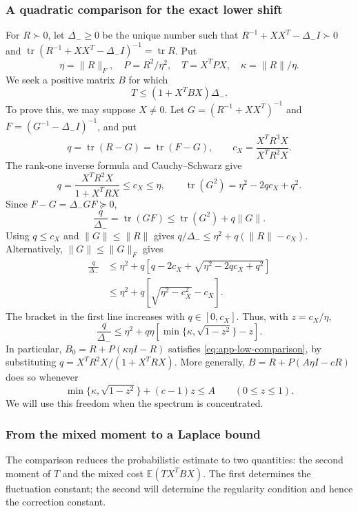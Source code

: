 \documentclass[11pt,a4paper]{article}
\numberwithin{equation}{section}
\begin{document}
\subsubsection{A quadratic comparison for the exact lower shift}
For $R\succ0$, let $\Delta_-\ge0$ be the unique number such that
$R^{-1}+XX^T-\Delta_-I\succ0$ and
$\operatorname{tr}(R^{-1}+XX^T-\Delta_-I)^{-1}=\operatorname{tr}R$.
Put
\[
 \eta=\|R\|_F,\quad P=R^2/\eta^2,\quad T=X^TPX,
 \quad\kappa=\|R\|/\eta.
\]
We seek a positive matrix $B$ for which
\begin{equation}\label{eq:app-low-comparison}
 T\le(1+X^TBX)\Delta_-.
\end{equation}
To prove this, we may suppose $X\ne0$. Let
$G=(R^{-1}+XX^T)^{-1}$ and
$F=(G^{-1}-\Delta_-I)^{-1}$, and put
\[
 q=\operatorname{tr}(R-G)=\operatorname{tr}(F-G),\qquad
 c_X=\frac{X^TR^3X}{X^TR^2X}.
\]
The rank-one inverse formula and Cauchy--Schwarz give
\[
 q=\frac{X^TR^2X}{1+X^TRX}\le c_X\le\eta,
 \qquad \operatorname{tr}(G^2)=\eta^2-2q c_X+q^2.
\]
Since $F-G=\Delta_-GF\succeq0$,
\[
 \frac q{\Delta_-}=\operatorname{tr}(GF)
 \le\operatorname{tr}(G^2)+q\|G\|.
\]
Using $q\le c_X$ and $\|G\|\le\|R\|$ gives
$q/\Delta_-\le\eta^2+q(\|R\|-c_X)$. Alternatively,
$\|G\|\le\|G\|_F$ gives
\[
 \begin{split}
 \frac q{\Delta_-}
 &\le\eta^2+q\left[q-2c_X+\sqrt{\eta^2-2q c_X+q^2}\right]\\
 &\le\eta^2+q\left[\sqrt{\eta^2-c_X^2}-c_X\right].
 \end{split}
\]
The bracket in the first line increases with $q\in[0,c_X]$.
Thus, with $z=c_X/\eta$,
\begin{equation}\label{eq:app-low-two-comparisons}
 \frac q{\Delta_-}\le\eta^2+q\eta
 \left[\min\{\kappa,\sqrt{1-z^2}\}-z\right].
\end{equation}
In particular, $B_0=R+P(\kappa\eta I-R)$ satisfies
\eqref{eq:app-low-comparison}, by substituting
$q=X^TR^2X/(1+X^TRX)$. More generally,
$B=R+P(A\eta I-cR)$ does so whenever
\[
 \min\{\kappa,\sqrt{1-z^2}\}+(c-1)z\le A\qquad(0\le z\le1).
\]
We will use this freedom when the spectrum is concentrated.

\subsubsection{From the mixed moment to a Laplace bound}
The comparison reduces the probabilistic estimate to two quantities:
the second moment of $T$ and the mixed cost $\mathbb E(TX^TBX)$.
The first determines the fluctuation constant; the second will determine
the regularity condition and hence the correction constant.
\end{document}
